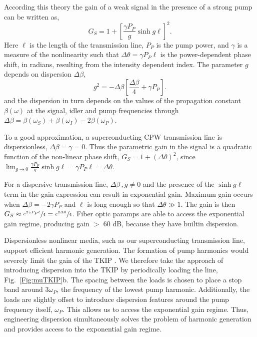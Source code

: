 According this theory \cite{Stolen1982} the gain of a weak signal in the presence of a strong pump can be written as,
\begin{equation}
	G_S = 1+ \left[ \frac{\gamma P_P}{g} \sinh g \ell \right]^2.
\end{equation}
Here $\ell$ is the length of the transmission line, $P_P$ is the pump power, and $\gamma$ is a measure of the nonlinearity such that $\Delta \theta = \gamma P_P \ell$ is the power-dependent phase shift, in radians, resulting from the intensity dependent index. The parameter $g$ depends on dispersion $\Delta \beta$,
\begin{equation}
	g^2 = - \Delta \beta \left[ \frac{\Delta \beta}{4} + \gamma P_P\right].
\end{equation}
and the dispersion in turn depends on the values of the propagation constant $\beta(\omega)$ at the signal, idler and pump frequencies through $\Delta \beta = \beta(\omega_S) + \beta(\omega_I) -2\beta(\omega_P)$.


To a good approximation, a superconducting CPW transmission line is dispersionless, $\Delta \beta = \gamma = 0$. Thus the parametric gain in the signal is a quadratic function of the non-linear phase shift, $G_S = 1 + (\Delta \theta)^2$, since  $ \lim_{g \to 0} \frac{\gamma P_P}{g} \sinh g \ell =  \gamma P_P \ell = \Delta \theta$.

  
For a dispersive transmission line, $\Delta \beta \, , g \neq 0 $ and the presence of the $\sinh  g \ell$ term in the gain
expression can result in exponential gain. Maximum gain occurs when $\Delta \beta = -2 \gamma P_P$ and $\ell$  is long enough so that $\Delta \theta \gg 1$. The gain is then $G_S \approx \sfrac{e^{2\gamma P_P \ell}}{4} = \sfrac{e^{2\Delta \theta}}{4}$. Fiber optic paramps are able to access the exponential gain regime, producing gain $>$ 60 dB, because they have builtin dispersion.  

Dispersionless nonlinear media, such as our superconducting transmission line, support efficient harmonic generation. The formation of pump harmonics would severely limit the gain of the TKIP \cite{Landauer1960}. We therefore take the approach of introducing  dispersion into  the TKIP by periodically loading the line, Fig.~\ref{Fig:muTKIP}b. The spacing between the loads is chosen to place a stop band around $3\omega_P$, the frequency of the lowest pump harmonic. Additionally, the loads are slightly offset to introduce dispersion features around the pump frequency itself, $\omega_P$. This allows us to access the exponential gain regime. Thus, engineering dispersion simultaneously solves the problem of harmonic generation and provides access to the exponential gain regime.   


